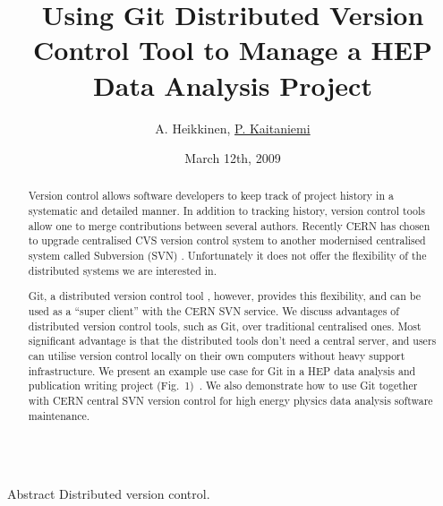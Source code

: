 \documentclass[final,hyperref={pdfpagelabels=false},notitlepage=true]{beamer}
\title[]{\Huge Using Git Distributed Version Control Tool to Manage a HEP Data Analysis Project}
\author{A. Heikkinen\inst{1}, \underline{P. Kaitaniemi\inst{1,2}}}
\institute[Helsinki Institute of Physics] %
{
  \inst{1}%
  Helsinki Institute of Physics
  \\
  \inst{2}%
  CEA/Saclay
}
\date[March 12th, 2009]{March 12th, 2009}
\begin{document}
  \begin{frame}{} 
    \begin{center}
    \maketitle
    \end{center}
    \vfill
    \begin{abstract}
Version control allows software developers to keep track of project history in
a systematic and detailed manner. 
In addition to tracking history, version control tools allow
one to merge contributions between several authors.
Recently CERN has chosen to upgrade centralised CVS version control
system \cite{cernsvn} to another modernised centralised system called Subversion (SVN) \cite{svnsite}.
Unfortunately it does not offer the flexibility of the
distributed systems we are interested in. 

Git, a distributed version control tool \cite{torvalds}, however, 
provides this flexibility, 
and can be used as a ``super client'' with the CERN SVN service.
We discuss advantages of distributed version control tools,
such as Git, over traditional centralised ones. 
Most significant advantage is that the distributed
tools don't need a central server, and users can utilise
version control locally on their own computers without
heavy support infrastructure.
We present an example use case for Git in a HEP data analysis and publication writing project (Fig.~1)~\cite{pk09aProceedings}.
We also demonstrate how to use Git
together with CERN central SVN version control for high energy physics data
analysis software maintenance.

    \end{abstract}
    \begin{columns}[t]
      \begin{column}{0.45\linewidth}

    \begin{block}{\large Abstract}
      Distributed version control.
    \end{block}


\end{column}
\end{columns}
\end{frame}
\end{document}
